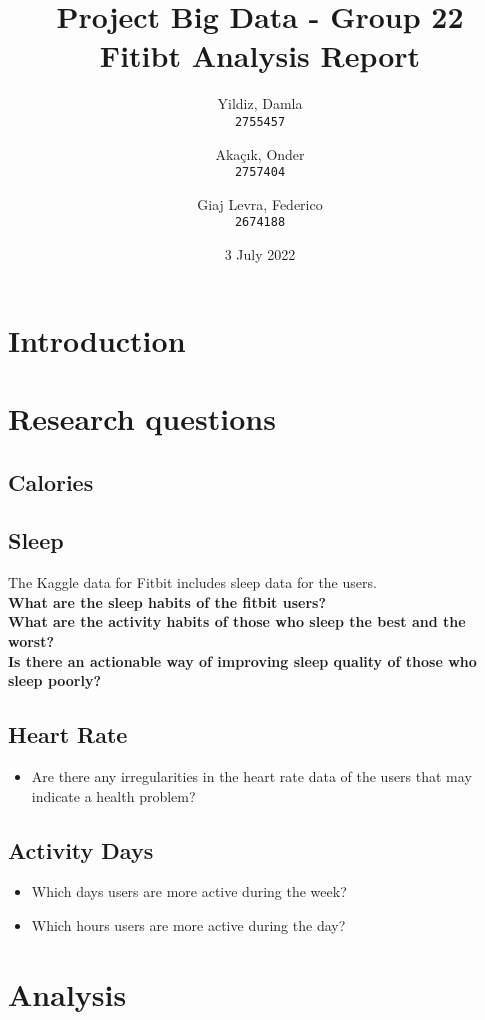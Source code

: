 \documentclass{report}
\title{Project Big Data - Group 22\\[2ex]
Fitibt Analysis Report}
\author{
  Yildiz, Damla\\
  \texttt{2755457}
  \and
  Akaçık, Onder\\
  \texttt{2757404}
  \and
  Giaj Levra, Federico\\
  \texttt{2674188}
}
\date{3 July 2022}
\begin{document}
\maketitle
\tableofcontents
\section{Introduction}
\cite{og_data} %
\cite{kg_data} %
\section{Research questions}
\subsection{Calories}
\subsection{Sleep}
The Kaggle data for Fitbit includes sleep data for the users. \\
\textbf{What are the sleep habits of the fitbit users?} \\
\textbf{What are the activity habits of those who sleep the best and the worst?} \\
\textbf{Is there an actionable way of improving sleep quality of those who sleep poorly?} \\

\subsection{Heart Rate}
\begin{itemize}
\item Are there any irregularities in the heart rate data of the users that may indicate a health problem? 
\end{itemize}

\subsection{Activity Days}
\begin{itemize}
\item Which days users are more active during the week?
\item Which hours users are more active during the day?
\end{itemize}

\section{Analysis}
\end{document}

